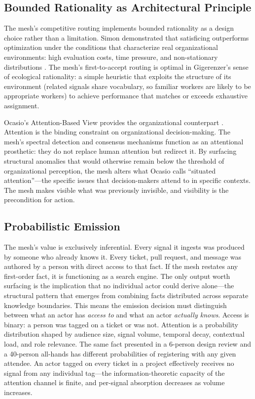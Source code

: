 \documentclass[11pt,a4paper]{article}
\begin{document}
\subsection{Bounded Rationality as Architectural Principle}
\label{sec:bounded}

The mesh's competitive routing implements bounded rationality as a design choice rather than a limitation. Simon demonstrated that satisficing outperforms optimization under the conditions that characterize real organizational environments: high evaluation costs, time pressure, and non-stationary distributions \citep{simon1956}. The mesh's first-to-accept routing is optimal in Gigerenzer's sense of ecological rationality: a simple heuristic that exploits the structure of its environment (related signals share vocabulary, so familiar workers are likely to be appropriate workers) to achieve performance that matches or exceeds exhaustive assignment.

Ocasio's Attention-Based View provides the organizational counterpart \citep{ocasio1997}. Attention is the binding constraint on organizational decision-making. The mesh's spectral detection and consensus mechanisms function as an attentional prosthetic: they do not replace human attention but redirect it. By surfacing structural anomalies that would otherwise remain below the threshold of organizational perception, the mesh alters what Ocasio calls ``situated attention''---the specific issues that decision-makers attend to in specific contexts. The mesh makes visible what was previously invisible, and visibility is the precondition for action.


\subsection{Probabilistic Emission}
\label{sec:emission}

The mesh's value is exclusively inferential. Every signal it ingests was produced by someone who already knows it. Every ticket, pull request, and message was authored by a person with direct access to that fact. If the mesh restates any first-order fact, it is functioning as a search engine. The only output worth surfacing is the implication that no individual actor could derive alone---the structural pattern that emerges from combining facts distributed across separate knowledge boundaries. This means the emission decision must distinguish between what an actor has \emph{access to} and what an actor \emph{actually knows}. Access is binary: a person was tagged on a ticket or was not. Attention is a probability distribution shaped by audience size, signal volume, temporal decay, contextual load, and role relevance. The same fact presented in a 6-person design review and a 40-person all-hands has different probabilities of registering with any given attendee. An actor tagged on every ticket in a project effectively receives no signal from any individual tag---the information-theoretic capacity of the attention channel is finite, and per-signal absorption decreases as volume increases.
\end{document}
